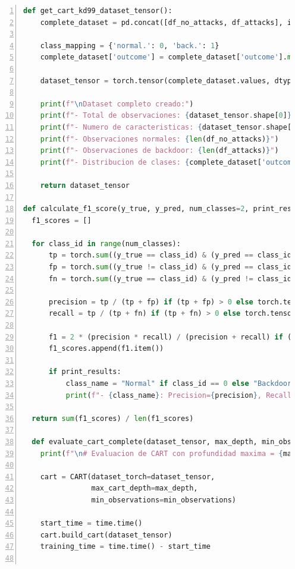 \documentclass[12pt,a4paper]{article}
\begin{document}
\begin{lstlisting}[language=Python, numbers=left, basicstyle=\ttfamily\tiny,label={lst:lstlisting9}]
  def get_cart_kd99_dataset_tensor():
    complete_dataset = pd.concat([df_no_attacks, df_attacks], ignore_index=True)

    class_mapping = {'normal.': 0, 'back.': 1}
    complete_dataset['outcome'] = complete_dataset['outcome'].map(class_mapping)

    dataset_tensor = torch.tensor(complete_dataset.values, dtype=torch.float32)

    print(f"\nDataset completo creado:")
    print(f"- Total de observaciones: {dataset_tensor.shape[0]}")
    print(f"- Numero de caracteristicas: {dataset_tensor.shape[1] - 1}")
    print(f"- Observaciones normales: {len(df_no_attacks)}")
    print(f"- Observaciones de backdoor: {len(df_attacks)}")
    print(f"- Distribucion de clases: {complete_dataset['outcome'].value_counts().to_dict()}")

    return dataset_tensor

def calculate_f1_score(y_true, y_pred, num_classes=2, print_results=False):
  f1_scores = []

  for class_id in range(num_classes):
      tp = torch.sum((y_true == class_id) & (y_pred == class_id)).float()
      fp = torch.sum((y_true != class_id) & (y_pred == class_id)).float()
      fn = torch.sum((y_true == class_id) & (y_pred != class_id)).float()

      precision = tp / (tp + fp) if (tp + fp) > 0 else torch.tensor(0.0)
      recall = tp / (tp + fn) if (tp + fn) > 0 else torch.tensor(0.0)

      f1 = 2 * (precision * recall) / (precision + recall) if (precision + recall) > 0 else torch.tensor(0.0)
      f1_scores.append(f1.item())

      if print_results:
          class_name = "Normal" if class_id == 0 else "Backdoor"
          print(f"- {class_name}: Precision={precision}, Recall={recall}, F1={f1}")

  return sum(f1_scores) / len(f1_scores)

  def evaluate_cart_complete(dataset_tensor, max_depth, min_observations=2):
    print(f"\n# Evaluacion de CART con profundidad maxima = {max_depth}")

    cart = CART(dataset_torch=dataset_tensor,
                max_cart_depth=max_depth,
                min_observations=min_observations)

    start_time = time.time()
    cart.build_cart(dataset_tensor)
    training_time = time.time() - start_time


\end{lstlisting}
\end{document}

